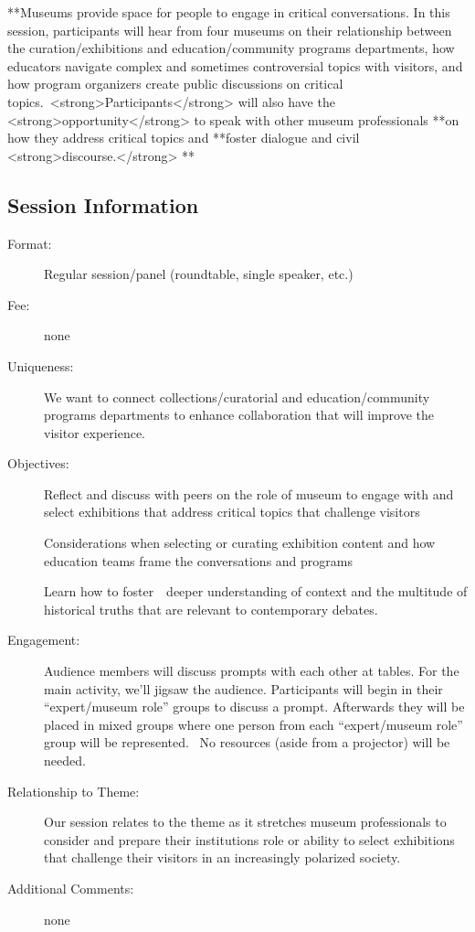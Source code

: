 \documentclass{report}
\begin{document}
              **Museums provide space for people to engage in critical conversations. In this session, participants will hear from four museums on their relationship between the curation/exhibitions and education/community programs departments, how educators navigate complex and sometimes controversial topics with visitors, and how program organizers create public discussions on critical topics. <strong>Participants</strong> will also have the <strong>opportunity</strong> to speak with other museum professionals **on how they address critical topics and **foster dialogue and civil <strong>discourse.</strong>   **

              \subsection*{Session Information}
                \begin{description}
                  \item [Format:] Regular session/panel (roundtable, single speaker, etc.)
							    
								  \item [Fee:]none
							     
							    \item [Uniqueness:]We want to connect collections/curatorial and education/community programs departments to enhance collaboration that will improve the visitor experience.
							    \item [Objectives:]Reflect and discuss with peers on the role of museum to engage with and select exhibitions that address critical topics that challenge visitors

Considerations when selecting or curating exhibition content and how education teams frame the conversations and programs

Learn how to foster  deeper understanding of context and the multitude of historical truths that are relevant to contemporary debates.
							    \item [Engagement:]Audience members will discuss prompts with each other at tables. For the main activity, we’ll jigsaw the audience. Participants will begin in their “expert/museum role” groups to discuss a prompt. Afterwards they will be placed in mixed groups where one person from each “expert/museum role” group will be represented. 
No resources (aside from a projector) will be needed.
							    \item [Relationship to Theme:]Our session relates to the theme as it stretches museum professionals to consider and prepare their institutions role or ability to select exhibitions that challenge their visitors in an increasingly polarized society.
							    
                    \item [Additional Comments: ]none

                \end{description}
\end{document}
